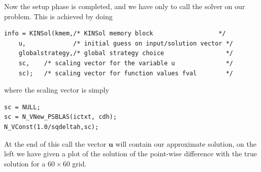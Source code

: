 \documentclass[twoside,a4paper]{refart}
\theoremstyle{definition}
\begin{document}
Now the setup phase is completed, and we have only to call the solver on our problem. This is achieved by doing
\begin{lstlisting}[style=CStyle]
info = KINSol(kmem,/* KINSol memory block                  */
	u,             /* initial guess on input/solution vector */
	globalstrategy,/* global strategy choice                 */
	sc,    /* scaling vector for the variable u              */
	sc);   /* scaling vector for function values fval        */
\end{lstlisting}
where the scaling vector is simply
\begin{lstlisting}[style=CStyle]
sc = NULL;
sc = N_VNew_PSBLAS(ictxt, cdh);
N_VConst(1.0/sqdeltah,sc);
\end{lstlisting}
At the end of this call the vector $\mathbf{u}$ will contain our approximate solution, on the left we have given a plot of the solution of the point-wise difference with the true solution for a $60\times 60$ grid.
\end{document}
